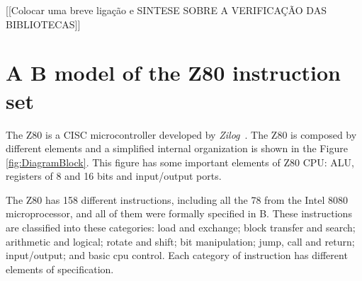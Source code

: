 \documentclass[a4paper]{llncs}
\begin{document}
%
[[Colocar uma breve ligação e SINTESE SOBRE A VERIFICAÇÃO DAS BIBLIOTECAS]]

\section{A B model of the Z80 instruction set}
\label{sec:z80}

The Z80 is a CISC microcontroller developed by \textit{Zilog}~\cite{Z80_manual}. 
The Z80 is composed by different elements and a simplified internal organization is shown in the Figure
\ref{fig:DiagramBlock}.  This figure has some important elements of
Z80 CPU: ALU, registers of 8 and 16 bits and input/output ports.
%


The Z80 has 158 different instructions, including all the 78 from the
Intel 8080 microprocessor, and all of them were formally specified in
B. These instructions are classified into these categories: load and
exchange; block transfer and search; arithmetic and logical; rotate
and shift; bit manipulation; jump, call and return; input/output; and
basic cpu control. Each category of instruction has different elements
of specification.
\end{document}
